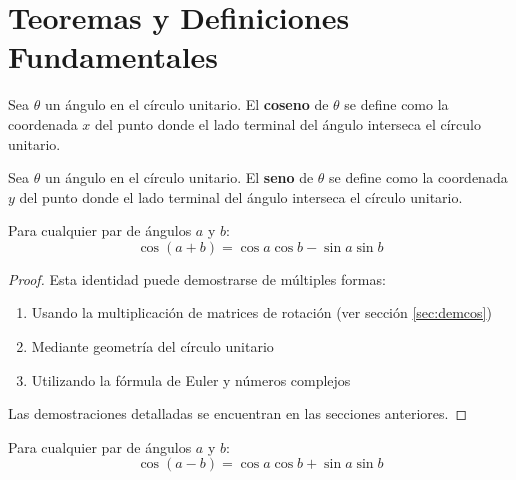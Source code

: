 \section{Teoremas y Definiciones Fundamentales}\label{sec:teoremas}

\begin{definition}
Sea $\theta$ un ángulo en el círculo unitario. El \textbf{coseno} de $\theta$ se define como la coordenada $x$ del punto donde el lado terminal del ángulo interseca el círculo unitario.
\end{definition}

\begin{definition}
Sea $\theta$ un ángulo en el círculo unitario. El \textbf{seno} de $\theta$ se define como la coordenada $y$ del punto donde el lado terminal del ángulo interseca el círculo unitario.
\end{definition}

\begin{theorem}\label{thm:coseno_suma}
Para cualquier par de ángulos $a$ y $b$:
\begin{equation}\label{eq:teorema_coseno_suma}
\cos(a + b) = \cos a \cos b - \sin a \sin b
\end{equation}
\end{theorem}

\begin{proof}
Esta identidad puede demostrarse de múltiples formas:
\begin{enumerate}
\item Usando la multiplicación de matrices de rotación (ver sección \ref{sec:demcos})
\item Mediante geometría del círculo unitario
\item Utilizando la fórmula de Euler y números complejos
\end{enumerate}
Las demostraciones detalladas se encuentran en las secciones anteriores.
\end{proof}

\begin{corollary}
Para cualquier par de ángulos $a$ y $b$:
\begin{equation}\label{eq:coseno_diferencia}
\cos(a - b) = \cos a \cos b + \sin a \sin b
\end{equation}
\end{corollary}

